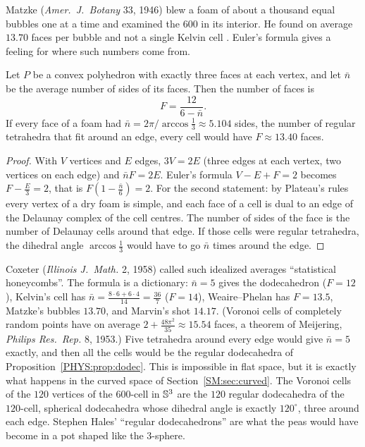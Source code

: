 Matzke (\emph{Amer.\ J.\ Botany} 33, 1946) blew a foam of about a thousand equal bubbles one at a time and
examined the $600$ in its interior. He found on average $13.70$ faces per bubble and not a single Kelvin cell
. Euler's formula gives a feeling for where such numbers come from.

\begin{proposition}\label{PHYS:prop:coxeter}
Let $P$ be a convex polyhedron with exactly three faces at each vertex, and let $\bar n$ be the average
number of sides of its faces. Then the number of faces is
\[
  F=\frac{12}{6-\bar n}.
\]
If every face of a foam had $\bar n=2\pi/\arccos\frac13\approx5.104$ sides, the number of regular
tetrahedra that fit around an edge, every cell would have $F\approx13.40$ faces.
\end{proposition}

\begin{proof}
With $V$ vertices and $E$ edges, $3V=2E$ (three edges at each vertex, two vertices on each edge) and $\bar
nF=2E$. Euler's formula $V-E+F=2$ becomes $F-\frac E3=2$, that is $F(1-\frac{\bar n}6)=2$. For the second
statement: by Plateau's rules every vertex of a dry foam is simple, and each face of a cell is dual to
an edge of the Delaunay complex of the cell centres. The number of sides of the face is the number of
Delaunay cells around that edge. If those cells were regular tetrahedra, the dihedral angle
$\arccos\frac13$ would have to go $\bar n$ times around the edge.
\end{proof}

Coxeter (\emph{Illinois J.\ Math.} 2, 1958) called such idealized averages ``statistical honeycombs''. The
formula is a dictionary: $\bar n=5$ gives the dodecahedron ($F=12$), Kelvin's cell has $\bar
n=\frac{8\cdot6+6\cdot4}{14}=\frac{36}7$ ($F=14$), Weaire--Phelan has $F=13.5$, Matzke's bubbles $13.70$,
and Marvin's shot $14.17$. (Voronoi cells of completely random points have on average
$2+\frac{48\pi^2}{35}\approx15.54$ faces, a theorem of Meijering, \emph{Philips Res.\ Rep.} 8, 1953.) Five tetrahedra around every edge would give
$\bar n=5$ exactly, and then all the cells would be the regular dodecahedra of
Proposition~\ref{PHYS:prop:dodec}. This is impossible in flat space, but it is exactly what happens in the
curved space of Section~\ref{SM:sec:curved}. The Voronoi cells of the $120$ vertices of the $600$-cell in
$\mathbb{S}^3$ are the $120$ regular dodecahedra of the $120$-cell, spherical dodecahedra whose dihedral angle is exactly
$120^\circ$, three around each edge. Stephen Hales' ``regular dodecahedrons'' are
what the peas would have become in a pot shaped like the $3$-sphere.

